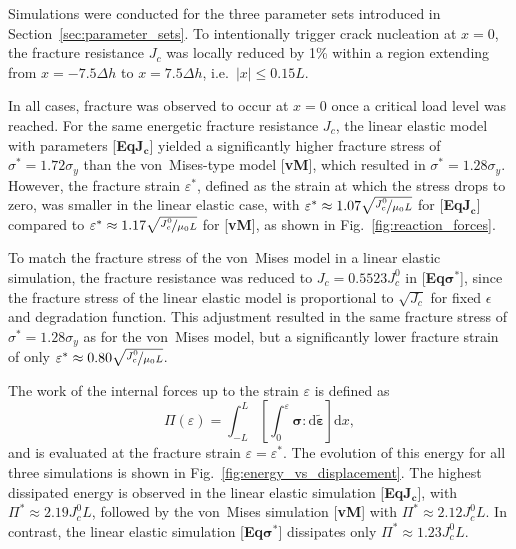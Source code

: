 \documentclass[pdflatex,sn-mathphys-num]{sn-jnl}%
\newcommand{\vMLabel}{[\textbf{vM}]\xspace}
\newcommand{\EqJcLabel}{[\textbf{Eq$\boldsymbol{J_c}$}]\xspace}
\newcommand{\EqSigmaStarLabel}{[\textbf{Eq$\boldsymbol{\sigma^*}$}]\xspace}
\theoremstyle{thmstyleone}%
\theoremstyle{thmstyletwo}%
\theoremstyle{thmstylethree}%
\begin{document}
Simulations were conducted for the three parameter sets introduced in Section~\ref{sec:parameter_sets}. To intentionally trigger crack nucleation at $x = 0$, the fracture resistance $J_c$ was locally reduced by 1\% within a region extending from $x=-7.5\Delta h$ to $x=7.5\Delta h$, i.e.\ $|x| \le 0.15L$.

In all cases, fracture was observed to occur at $x = 0$ once a critical load level was 
reached. For the same energetic fracture resistance $J_c$, the linear elastic model with parameters \EqJcLabel yielded a significantly higher fracture stress of $\sigma^* = 1.72\sigma_y$ than the von~Mises-type model \vMLabel, which resulted in $\sigma^* = 1.28\sigma_y$. However, the fracture strain $\varepsilon^*$, defined as the strain at which the stress drops to zero, was smaller in the linear elastic case, with $\varepsilon^* \approx 1.07\sqrt{\nicefrac{J_c^0}{\mu_0 L}}$ for \EqJcLabel compared to $\varepsilon^* \approx 1.17\sqrt{\nicefrac{J_c^0}{\mu_0 L}}$ for \vMLabel, as shown in Fig.~\ref{fig:reaction_forces}.

To match the fracture stress of the von~Mises model in a linear elastic simulation, the fracture resistance was reduced to $J_c = 0.5523J_c^0$ in \EqSigmaStarLabel, since the fracture stress of the linear elastic model is proportional to $\sqrt{J_c}$ for fixed $\epsilon$ and degradation function. This adjustment resulted in the same fracture stress of $\sigma^* = 1.28\sigma_y$ as for the von~Mises model, but a significantly lower fracture strain of only $\varepsilon^* \approx 0.80\sqrt{\nicefrac{J_c^0}{\mu_0 L}}$.

The work of the internal forces up to the strain $\varepsilon$ is defined as
\begin{equation}
   \Pi(\varepsilon) = \int_{-L}^{L}
   \left[\int_{0}^{\varepsilon} \boldsymbol{\sigma} :
   \mathrm{d}\tilde{\boldsymbol{\varepsilon}}\right] \mathrm{d}x,
   \label{eq:total_energy}
\end{equation}
and is evaluated at the fracture strain $\varepsilon = \varepsilon^*$. The evolution of this energy for all three simulations is shown in Fig.~\ref{fig:energy_vs_displacement}. The highest dissipated energy is observed in the linear elastic simulation \EqJcLabel, with $\Pi^* \approx 2.19J_c^0 L$, followed by the von~Mises simulation \vMLabel with $\Pi^* \approx 2.12J_c^0 L$. In contrast, the linear elastic simulation \EqSigmaStarLabel dissipates only $\Pi^* \approx 1.23J_c^0 L$.
\end{document}
